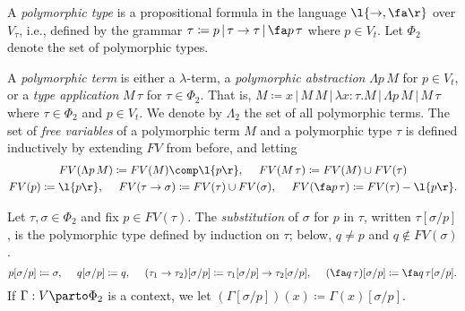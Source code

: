 \documentclass[reqno]{amsart}
\begin{document}
    \begin{definition}
        A \textit{polymorphic type} is a propositional formula in the language $\l\{\rightarrow,\fa\r\}$ over $V_\tau$, i.e., defined by the grammar $\tau\coloneqq p\,|\,\tau\rightarrow\tau\,|\,\fa p\,\tau$ where $p\in V_t$. Let $\Phi_2$ denote the set of polymorphic types.
    \end{definition}

    \begin{definition}
        A \textit{polymorphic term} is either a $\lambda$-term, a \textit{polymorphic abstraction} $\Lambda p\,M$ for $p\in V_t$, or a \textit{type application} $M\,\tau$ for $\tau\in\Phi_2$. That is, $M\coloneqq x\,|\,M\,M\,|\,\lambda x\!:\!\tau.M\,|\,\Lambda p\,M\,|\,M\,\tau$ where $\tau\in\Phi_2$ and $p\in V_t$. We denote by $\Lambda_2$ the set of all polymorphic terms. The set of \textit{free variables} of a polymorphic term $M$ and a polymorphic type $\tau$ is defined inductively by extending $FV$ from before, and letting
        \begin{equation*}
            \begin{gathered}
                FV(\Lambda p\,M)\coloneqq FV(M)\comp\l\{p\r\},\ \ \ \ FV(M\,\tau)\coloneqq FV(M)\cup FV(\tau) \\
                FV(p)\coloneqq\l\{p\r\},\ \ \ \ FV(\tau\rightarrow\sigma)\coloneqq FV(\tau)\cup FV(\sigma),\ \ \ \ FV(\fa p\,\tau)\coloneqq FV(\tau)-\l\{p\r\}.
            \end{gathered}
        \end{equation*}
    \end{definition}

    \begin{definition}
        Let $\tau,\sigma\in\Phi_2$ and fix $p\in FV(\tau)$. The \textit{substitution} of $\sigma$ for $p$ in $\tau$, written $\tau[\sigma/p]$, is the polymorphic type defined by induction on $\tau$; below, $q\neq p$ and $q\not\in FV(\sigma)$.
        \begin{equation*}
            p[\sigma/p]\coloneqq\sigma,\ \ \ \ q[\sigma/p]\coloneqq q,\ \ \ \ (\tau_1\rightarrow\tau_2)[\sigma/p]\coloneqq\tau_1[\sigma/p]\rightarrow\tau_2[\sigma/p],\ \ \ \ (\fa q\,\tau)[\sigma/p]\coloneqq\fa q\,\tau[\sigma/p].
        \end{equation*}
        If $\Gamma:V\parto\Phi_2$ is a context, we let $(\Gamma[\sigma/p])(x)\coloneqq\Gamma(x)[\sigma/p]$.
    \end{definition}
\end{document}
